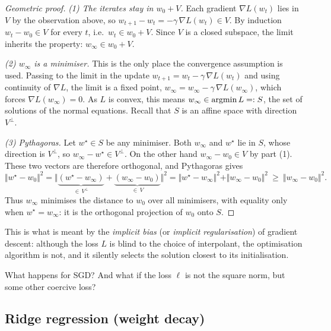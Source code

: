 \begin{proof}[Geometric proof]
\emph{(1) The iterates stay in $w_0 + V$.} Each gradient $\nabla L(w_t)$ lies in
$V$ by the observation above, so $w_{t+1} - w_t = -\gamma\, \nabla L(w_t) \in V$. By
induction $w_t - w_0 \in V$ for every $t$, i.e.\ $w_t \in w_0 + V$. Since $V$ is a
closed subspace, the limit inherits the property: $w_\infty \in w_0 + V$.

\emph{(2) $w_\infty$ is a minimiser.} This is the only place the convergence
assumption is used. Passing to the limit in the update $w_{t+1} = w_t - \gamma\,
\nabla L(w_t)$ and using continuity of $\nabla L$, the limit is a fixed point,
$w_\infty = w_\infty - \gamma\, \nabla L(w_\infty)$, which forces $\nabla L(w_\infty)
= 0$. As $L$ is convex, this means $w_\infty \in \operatorname*{argmin} L =: S$, the
set of solutions of the normal equations. Recall that $S$ is an affine space with
direction $V^\perp$.

\emph{(3) Pythagoras.} Let $w^\star \in S$ be any minimiser. Both $w_\infty$ and
$w^\star$ lie in $S$, whose direction is $V^\perp$, so $w_\infty - w^\star
\in V^\perp$. On the other hand $w_\infty - w_0 \in V$ by part (1). These two vectors
are therefore orthogonal, and Pythagoras gives
\[
\Vert w^\star - w_0 \Vert^2
= \Vert \underbrace{(w^\star - w_\infty)}_{\in\, V^\perp}
      + \underbrace{(w_\infty - w_0)}_{\in\, V} \Vert^2
= \Vert w^\star - w_\infty \Vert^2 + \Vert w_\infty - w_0 \Vert^2
\ \geq\ \Vert w_\infty - w_0 \Vert^2 .
\]
Thus $w_\infty$ minimises the distance to $w_0$ over all minimisers, with equality
only when $w^\star = w_\infty$: it is the orthogonal projection of $w_0$ onto $S$.
\end{proof}

This is what is meant by the \emph{implicit bias} (or \emph{implicit
regularisation}) of gradient descent: although the loss $L$ is blind to the choice
of interpolant, the optimisation algorithm is not, and it silently selects the
solution closest to its initialisation.

\begin{exercise}[$\star$]
What happens for SGD? And what if the loss $\ell$ is not the square norm, but some
other coercive loss?
\end{exercise}


\subsection{Ridge regression (weight decay)}
\label{subsec:ridge}

